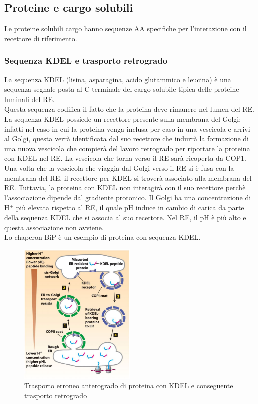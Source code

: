     \subsection{Proteine e cargo solubili}
        Le proteine solubili cargo hanno sequenze AA specifiche per l'interazione con il recettore di riferimento.
        \subsubsection{Sequenza KDEL e trasporto retrogrado}
            La sequenza KDEL (lisina, asparagina, acido glutammico e leucina) è una sequenza segnale posta al C-terminale del cargo solubile tipica delle proteine luminali del RE.\\ 
            Questa sequenza codifica il fatto che la proteina deve rimanere nel lumen del RE.\\
            La sequenza KDEL possiede un recettore presente sulla membrana del Golgi: infatti nel caso in cui la proteina venga inclusa per caso in una vescicola e arrivi al Golgi, questa verrà identificata dal suo recettore che indurrà la formazione di una nuova vescicola che compierà del lavoro retrogrado per riportare la proteina con KDEL nel RE. 
            La vescicola che torna verso il RE sarà ricoperta da COP1. \\
            Una volta che la vescicola che viaggia dal Golgi verso il RE si è fusa con la membrana del RE, il recettore per KDEL si troverà associato alla membrana del RE. Tuttavia, la proteina con KDEL non interagirà con il suo recettore perchè l'associazione dipende dal gradiente protonico. Il Golgi ha una concentrazione di H$^{+}$ più elevata rispetto al RE, il quale pH induce in cambio di carica da parte della sequenza KDEL che si associa al suo recettore.
            Nel RE, il pH è più alto e questa associazione non avviene.\\
            Lo chaperon BiP è un esempio di proteina con sequenza KDEL.
            \begin{figure}[h]
                \centering
                \includegraphics[width=0.5\textwidth]{images/KDEL.JPG}
                \caption{\small Trasporto erroneo anterogrado di proteina con KDEL e conseguente trasporto retrogrado}
                \label{fig:mesh1}
            \end{figure}

